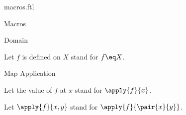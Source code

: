 \documentclass{naproche-library}
\begin{document}
\begin{smodule}{macros.ftl}
\begin{sfragment}{Macros}
\begin{sfragment}{Domain}
\begin{forthel}
      Let $f$ is defined on $X$ stand for $\dom{f}\eq X$.
    \end{forthel}
  \end{sfragment}

  \begin{sfragment}{Map Application}
    \begin{forthel}
      Let the value of $f$ at $x$ stand for $\apply{f}{x}$.

      Let $\apply{f}{x,y}$ stand for $\apply{f}{\pair{x}{y}}$.
    \end{forthel}
  \end{sfragment}
\end{sfragment}
\end{smodule}
\end{document}
